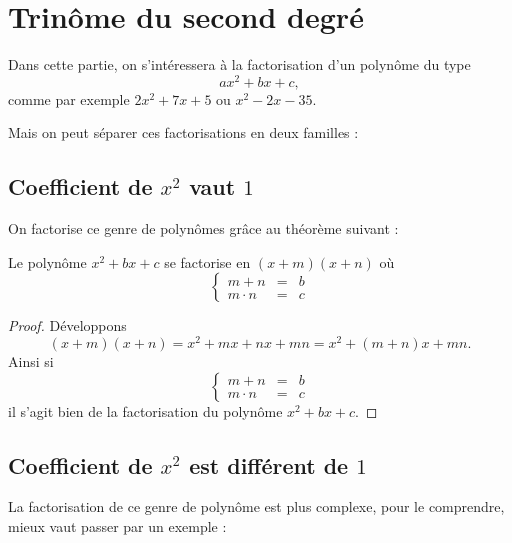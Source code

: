 \section{Trinôme du second degré}

Dans cette partie, on s'intéressera à la factorisation d'un polynôme du type
$$
ax^2 + bx + c,
$$
comme par exemple $2x^2 + 7x + 5$ ou $x^2 -2x - 35$.

Mais on peut séparer ces factorisations en deux familles :

\subsection{Coefficient de $x^2$ vaut $1$}

On factorise ce genre de polynômes grâce au théorème suivant :

\begin{theoreme}
Le polynôme 
$
x^2 + bx + c
$
se factorise en 
$
(x+m)(x+n)
$
où 
$$
\left\{
\begin{array}{lcl}
m+n &=& b \\
m\cdot n &=& c
\end{array}
\right.
$$
\end{theoreme}

\begin{proof}
Développons 
$$
(x+m)(x+n) = x^2 + mx + nx + mn = x^2 + (m+n)x + mn.
$$
Ainsi si
$$
\left\{
\begin{array}{lcl}
m+n &=& b \\
m\cdot n &=& c
\end{array}
\right.
$$
il s'agit bien de la factorisation du polynôme 
$x^2 + bx + c$.
\end{proof}

\subsection{Coefficient de $x^2$ est différent de $1$}\label{factorisertrinome}

La factorisation de ce genre de polynôme est plus complexe, pour le comprendre, mieux vaut passer par un exemple :


